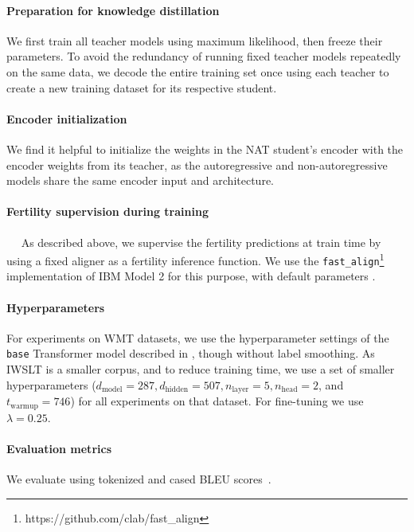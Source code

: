 \documentclass{article} \usepackage{iclr2018_conference,times}
\begin{document}
\vspace{-5pt}
\paragraph{Preparation for knowledge distillation} We first train all teacher models using maximum likelihood, then freeze their parameters. To avoid the redundancy of running fixed teacher models repeatedly on the same data, we decode the entire training set once using each teacher to create a new training dataset for its respective student.

\vspace{-5pt}
\paragraph{Encoder initialization}
We find it helpful to initialize the weights in the NAT student's encoder with the encoder weights from its teacher, as the autoregressive and non-autoregressive models share the same encoder input and architecture.

\vspace{-5pt}
\paragraph{Fertility supervision during training}~~
As described above, we supervise the fertility predictions at train time by using a fixed aligner as a fertility inference function. We use the \texttt{fast\_align}\footnote{https://github.com/clab/fast\_align} implementation of IBM Model 2 for this purpose, with default parameters
\citep{dyer2013simple}.

\vspace{-5pt}
\paragraph{Hyperparameters}
For experiments on WMT datasets, we use the hyperparameter settings of the \texttt{base} Transformer model described in \citet{vaswani2017attention}, though without label smoothing. As IWSLT is a smaller corpus, and to reduce training time, we use a set of smaller hyperparameters ($d_{\text{model}}=287, d_{\text{hidden}}=507, n_{\text{layer}}=5, n_{\text{head}}=2$, and $t_\text{warmup}=746$) for all experiments on that dataset.
For fine-tuning we use $\lambda=0.25$.

\vspace{-5pt}
\paragraph{Evaluation metrics} We evaluate using tokenized and cased BLEU scores~\citep{papineni2002bleu}.
\end{document}
